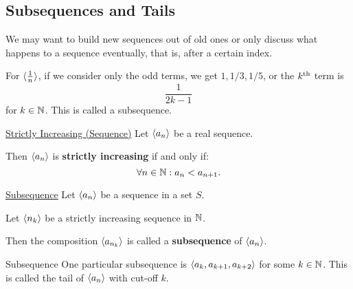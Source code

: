 \subsection{Subsequences and Tails}
We may want to build new sequences out of old ones or only discuss what happens to a sequence eventually, that is, after a certain index.
\begin{Example}{}{}
    For $ \langle\frac{1}{n}\rangle $, if we consider only the odd terms, we get $ 1,1/3,1/5 $, or the $ k\textsuperscript{th} $
    term is
    \[ \frac{1}{2k-1} \]
    for $ k\in\mathbb{N} $.
    This is called a subsequence.
\end{Example}
\begin{Definition}{\href{https://proofwiki.org/wiki/Definition:Strictly_Increasing/Sequence/Real_Sequence\#Definition}{Strictly Increasing (Sequence)}}{}
    Let $ \langle a_n\rangle $ be a real sequence.\bigskip

    Then $ \langle a_n\rangle $ is \textbf{strictly increasing} if and only if:
    \[ \forall n\in\mathbb{N}:a_n<a_{n+1}. \]
\end{Definition}
\begin{Definition}{\href{https://proofwiki.org/wiki/Definition:Subsequence}{Subsequence}}{}
    Let $ \langle a_n\rangle $ be a sequence in a set $ S $.\smallskip

    Let $ \langle n_k\rangle $ be a strictly increasing sequence in $ \mathbb{N} $.\bigskip

    Then the composition $ \langle a_{n_k}\rangle $ is called a \textbf{subsequence} of $ \langle a_n\rangle $.
\end{Definition}
\begin{Example}{Subsequence}{}
    One particular subsequence is $ \langle a_k,a_{k+1},a_{k+2}\rangle $ for some $ k\in\mathbb{N} $.
    This is called the tail of $ \langle a_n\rangle $ with cut-off $ k $.
\end{Example}
